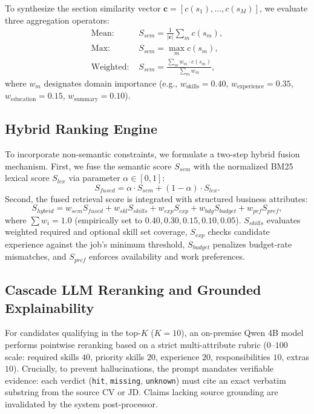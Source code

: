 \documentclass[runningheads]{llncs}
\begin{document}
To synthesize the section similarity vector $\mathbf{c} = [c(s_1), \dots, c(s_M)]$, we evaluate three aggregation operators:
\begin{align}
    \text{Mean: } & S_{sem} = \frac{1}{|\mathbf{c}|} \sum_{m} c(s_m), \\
    \text{Max: } & S_{sem} = \max_{m} c(s_m), \\
    \text{Weighted: } & S_{sem} = \frac{\sum_{m} w_m \cdot c(s_m)}{\sum_{m} w_m},
\end{align}
where $w_m$ designates domain importance (e.g., $w_{\text{skills}} = 0.40$, $w_{\text{experience}} = 0.35$, $w_{\text{education}} = 0.15$, $w_{\text{summary}} = 0.10$).

\subsection{Hybrid Ranking Engine}
\label{sec:hybrid}
To incorporate non-semantic constraints, we formulate a two-step hybrid fusion mechanism. First, we fuse the semantic score $S_{sem}$ with the normalized BM25 lexical score $S_{lex}$ via parameter $\alpha \in [0, 1]$:
\begin{equation}
    S_{fused} = \alpha \cdot S_{sem} + (1 - \alpha) \cdot S_{lex}.
    \label{eq:fuse}
\end{equation}
Second, the fused retrieval score is integrated with structured business attributes:
\begin{equation}
    S_{hybrid} = w_{sem} S_{fused} + w_{skl} S_{skills} + w_{exp} S_{exp} + w_{bdg} S_{budget} + w_{prf} S_{pref},
    \label{eq:hybrid}
\end{equation}
where $\sum w_i = 1.0$ (empirically set to $0.40, 0.30, 0.15, 0.10, 0.05$). $S_{skills}$ evaluates weighted required and optional skill set coverage, $S_{exp}$ checks candidate experience against the job's minimum threshold, $S_{budget}$ penalizes budget-rate mismatches, and $S_{pref}$ enforces availability and work preferences.

\subsection{Cascade LLM Reranking and Grounded Explainability}
For candidates qualifying in the top-$K$ ($K=10$), an on-premise Qwen 4B model performs pointwise reranking based on a strict multi-attribute rubric ($0$--$100$ scale: required skills $40$, priority skills $20$, experience $20$, responsibilities $10$, extras $10$). Crucially, to prevent hallucinations, the prompt mandates verifiable evidence: each verdict (\texttt{hit}, \texttt{missing}, \texttt{unknown}) must cite an exact verbatim substring from the source CV or JD. Claims lacking source grounding are invalidated by the system post-processor.
\end{document}
